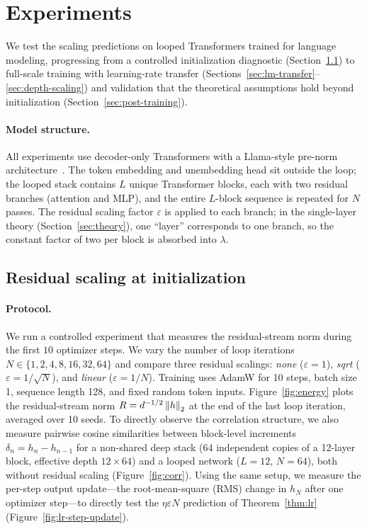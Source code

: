 \section{Experiments}
\label{sec:experiments}

We test the scaling predictions on looped Transformers trained for language modeling, progressing from a controlled initialization diagnostic (Section~\ref{sec:init-scaling}) to full-scale training with learning-rate transfer (Sections~\ref{sec:lm-transfer}--\ref{sec:depth-scaling}) and validation that the theoretical assumptions hold beyond initialization (Section~\ref{sec:post-training}).

\paragraph{Model structure.}
All experiments use decoder-only Transformers with a Llama-style pre-norm architecture~\citep{DBLP:conf/nips/VaswaniSPUJGKP17,DBLP:journals/corr/abs-2302-13971}.
The token embedding and unembedding head sit outside the loop; the looped stack contains $L$ unique Transformer blocks, each with two residual branches (attention and MLP), and the entire $L$-block sequence is repeated for $N$ passes.
The residual scaling factor $\varepsilon$ is applied to each branch; in the single-layer theory (Section~\ref{sec:theory}), one ``layer'' corresponds to one branch, so the constant factor of two per block is absorbed into $\lambda$.

\subsection{Residual scaling at initialization}
\label{sec:init-scaling}

\paragraph{Protocol.}
We run a controlled experiment that measures the residual-stream norm during the first $10$ optimizer steps.
We vary the number of loop iterations $N\in\{1,2,4,8,16,32,64\}$ and compare three residual scalings: \emph{none} ($\varepsilon{=}1$), \emph{sqrt} ($\varepsilon{=}1/\sqrt{N}$), and \emph{linear} ($\varepsilon{=}1/N$).
Training uses AdamW for 10 steps, batch size 1, sequence length 128, and fixed random token inputs.
Figure~\ref{fig:energy} plots the residual-stream norm $R=d^{-1/2}\left\lVert h \right\rVert_2$ at the end of the last loop iteration, averaged over 10 seeds.
To directly observe the correlation structure, we also measure pairwise cosine similarities between block-level increments $\delta_n = h_n - h_{n-1}$ for a non-shared deep stack ($64$ independent copies of a 12-layer block, effective depth $12{\times}64$) and a looped network ($L{=}12$, $N{=}64$), both without residual scaling (Figure~\ref{fig:corr}).
Using the same setup, we measure the per-step output update---the root-mean-square (RMS) change in $h_N$ after one optimizer step---to directly test the $\eta\varepsilon N$ prediction of Theorem~\ref{thm:lr} (Figure~\ref{fig:lr-step-update}).

